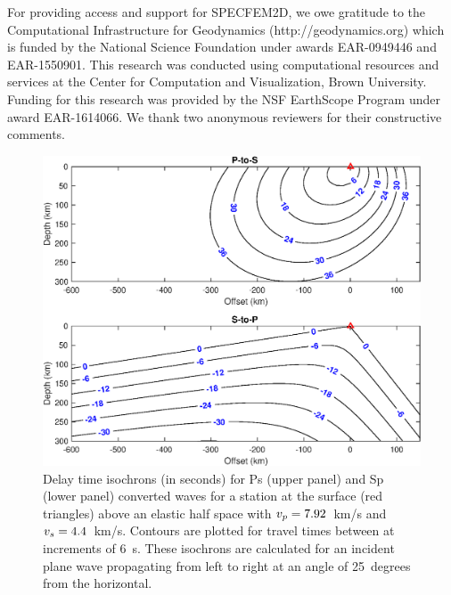 \documentclass[referee]{gji}
\begin{document}
\begin{acknowledgments}

For providing access and support for SPECFEM2D, we owe gratitude to the Computational Infrastructure for Geodynamics (http://geodynamics.org) which is funded by the National Science Foundation under awards EAR-0949446 and EAR-1550901. This research was conducted using computational resources and services at the Center for Computation and Visualization, Brown University.
Funding for this research was provided by the NSF EarthScope Program  under award EAR-1614066.
We thank two anonymous reviewers for their constructive comments.

\end{acknowledgments}




\bsp %

\newpage

\begin{figure}
\centering
\includegraphics[]{img/figure1.eps}
\caption{Delay time isochrons (in seconds) for Ps (upper panel) and Sp (lower panel) converted waves for a station at the surface (red triangles) above an elastic half space with $v_p=7.92$~km/s and $v_s=4.4$~km/s. Contours are plotted for travel times between at increments of 6~s.  These isochrons are calculated for an incident plane wave propagating from left to right at an angle of 25~degrees from the horizontal.}
\label{fig:isochrons}
\end{figure}
\end{document}
